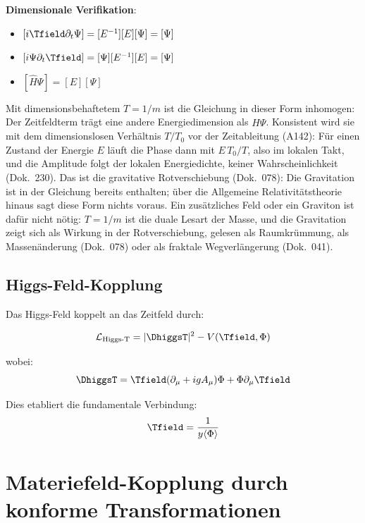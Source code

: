 	\textbf{Dimensionale Verifikation}:
	\begin{itemize}
		\item $[i \Tfield \partial_t \Psi] = [E^{-1}][E][\Psi] = [\Psi]$
		\item $[i \Psi \partial_t \Tfield] = [\Psi][E^{-1}][E] = [\Psi]$
		\item $[\hat{H} \Psi] = [E][\Psi]$
	\end{itemize}
	Mit dimensionsbehaftetem $T=1/m$ ist die Gleichung in dieser Form inhomogen: Der Zeitfeldterm trägt eine andere Energiedimension als $\hat H\Psi$. Konsistent wird sie mit dem dimensionslosen Verhältnis $T/T_0$ vor der Zeitableitung (A142): Für einen Zustand der Energie $E$ läuft die Phase dann mit $E\,T_0/T$, also im lokalen Takt, und die Amplitude folgt der lokalen Energiedichte, keiner Wahrscheinlichkeit (Dok.~230). Das ist die gravitative Rotverschiebung (Dok.~078): Die Gravitation ist in der Gleichung bereits enthalten; über die Allgemeine Relativitätstheorie hinaus sagt diese Form nichts voraus. Ein zusätzliches Feld oder ein Graviton ist dafür nicht nötig: $T=1/m$ ist die duale Lesart der Masse, und die Gravitation zeigt sich als Wirkung in der Rotverschiebung, gelesen als Raumkrümmung, als Massenänderung (Dok.~078) oder als fraktale Wegverlängerung (Dok.~041).
	
	\subsection{Higgs-Feld-Kopplung}
	\label{subsec:higgs_kopplung}
	
	Das Higgs-Feld koppelt an das Zeitfeld durch:
	
	\begin{equation}
		\mathcal{L}_{\text{Higgs-T}} = |\DhiggsT|^2 - V(\Tfield, \Phi)
		\label{eq:higgs_zeit_kopplung}
	\end{equation}
	
	wobei:
	\begin{equation}
		\DhiggsT = \Tfield (\partial_\mu + ig A_\mu) \Phi + \Phi \partial_\mu \Tfield
		\label{eq:higgs_verbindung}
	\end{equation}
	
	Dies etabliert die fundamentale Verbindung:
	\begin{equation}
		\Tfield = \frac{1}{y\langle\Phi\rangle}
		\label{eq:zeit_higgs_relation}
	\end{equation}
	
	\section{Materiefeld-Kopplung durch konforme Transformationen}
	\label{sec:materie_kopplung}
	
